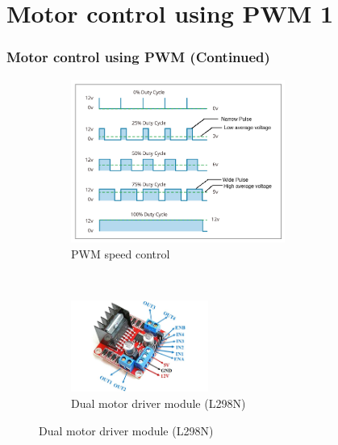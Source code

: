 \documentclass[xcolor=table]{beamer}
\begin{document}
\section{Motor control using PWM 1}
\begin{frame}
\frametitle{Motor control using PWM \small{(Continued)}}
\begin{figure}[t!]
    \centering
    \begin{subfigure}[t]{0.5\textwidth}
        \centering
        \includegraphics[width = 7cm]{./figs/PWM_speed_control.png}
        \caption{PWM speed control}
    \end{subfigure}%
    ~ 
    \begin{subfigure}[t]{0.5\textwidth}
        \centering
        \includegraphics[width = 4.5cm]{./figs/Motor_driver_L298.jpg}
        \caption{Dual motor driver module (L298N)}
    \end{subfigure}

\end{figure} 	
\end{frame}
\end{document}
